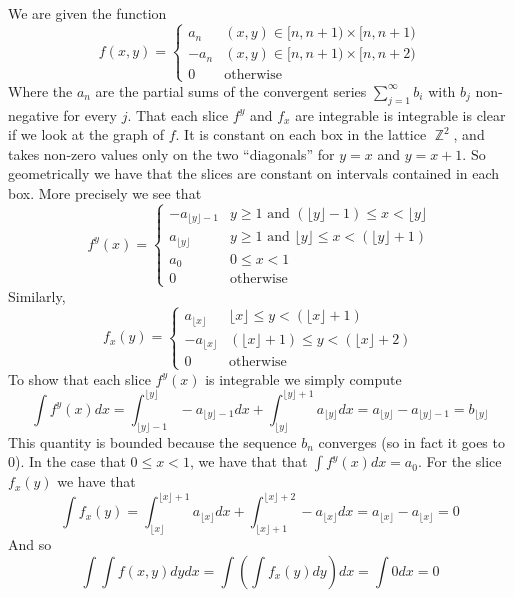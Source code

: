 \documentclass{article}
\DeclareMathOperator{\Z}{\mathbb{Z}}
\newcommand{\problem}[1]{\noindent{\textbf{Problem #1}}\\}
\newcommand{\problempart}[1]{\noindent{\textbf{(#1)}}}
\begin{document}
\problem{2.5.17}
\problempart{a} We are given the function
\[
f(x,y) = 
\begin{cases}
a_n   & (x,y) \in [n,n+1) \times [n, n+1) \\
-a_n & (x,y) \in [n,n+1) \times [n, n+2) \\
0      & \text{otherwise}
\end{cases}
\]
Where the $a_n$ are the partial sums of the convergent series $\sum_{j=1}^\infty b_i$ with $b_j$ non-negative for every $j$. That each slice $f^y$ and $f_x$ are integrable is integrable is clear if we look at the graph of $f$. It is constant on each box in the lattice $\Z^2$, and takes non-zero values only on the two ``diagonals'' for $y = x$ and $y = x+1$. So geometrically we have that the slices are constant on intervals contained in each box. More precisely we see that
\[
f^y(x) = 
\begin{cases}
-a_{\lfloor y \rfloor - 1} & y \geq 1 \text{ and } (\lfloor y \rfloor - 1) \leq x < \lfloor y \rfloor \\
a_{\lfloor y \rfloor}         & y \geq 1 \text{ and }\lfloor y \rfloor \leq x < (\lfloor y \rfloor + 1)\\
a_0                                 & 0 \leq x < 1 \\
0                                    & \text{otherwise}
\end{cases}
\]
Similarly,
\[
f_x(y) = 
\begin{cases}
a_{\lfloor x \rfloor}         & \lfloor x \rfloor \leq y < (\lfloor x \rfloor + 1)\\
-a_{\lfloor x \rfloor}         & (\lfloor x \rfloor + 1) \leq y < (\lfloor x \rfloor + 2) \\
0                                    & \text{otherwise}
\end{cases}
\]
To show that each slice $f^y(x)$ is integrable we simply compute
\[
\int f^y(x)dx = \int_{\lfloor y \rfloor - 1}^{\lfloor y \rfloor} -a_{\lfloor y \rfloor - 1}dx + \int_{\lfloor y \rfloor}^{\lfloor y \rfloor + 1} a_{\lfloor y \rfloor}dx = a_{\lfloor y \rfloor} - a_{\lfloor y \rfloor - 1} = b_{\lfloor y \rfloor}
\]
This quantity is bounded because the sequence $b_n$ converges (so in fact it goes to 0). In the case that $0 \leq x < 1$, we have that that $\int f^y(x)dx = a_0$. For the slice $f_x(y)$ we have that
\[
\int f_x(y) = \int_{\lfloor x \rfloor}^{\lfloor x \rfloor + 1} a_{\lfloor x \rfloor}dx + \int_{\lfloor x \rfloor + 1}^{\lfloor x \rfloor + 2} -a_{\lfloor x \rfloor}dx = a_{\lfloor x \rfloor} - a_{\lfloor x \rfloor} = 0
\]
And so
\[
\int\int f(x,y)dydx = \int\left(\int f_x(y)dy\right)dx = \int 0dx = 0
\]
\end{document}
